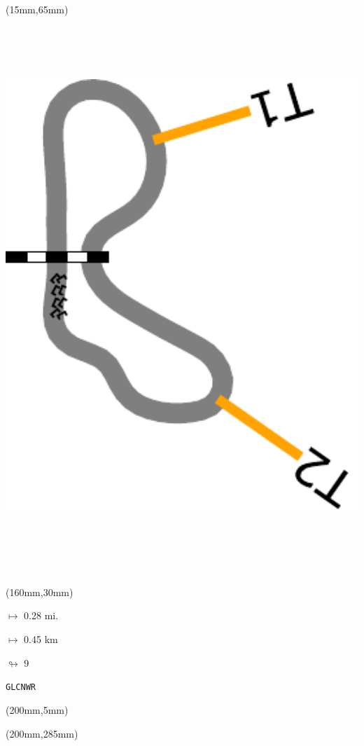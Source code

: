 \begin{textblock*}{185mm}(15mm,65mm)%
\centering
\mbox{\includegraphics[width=185mm,height=210mm,keepaspectratio]{PT/GLCNWR.pdf}}
\end{textblock*}
\begin{textblock*}{40mm}(160mm,30mm)%
\Large
\par$\mapsto$ 0.28 mi.
\par$\mapsto$ 0.45 km
\par$\looparrowright$ 9
\par\hfill\tiny\tt GLCNWR\\
\end{textblock*}
\begin{textblock*}{20mm}(200mm,5mm)%
\fbox{\thepage}
\label{GLCNWR}
\end{textblock*}
\begin{textblock*}{20mm}(200mm,285mm)%
\fbox{\thepage}
\end{textblock*}

